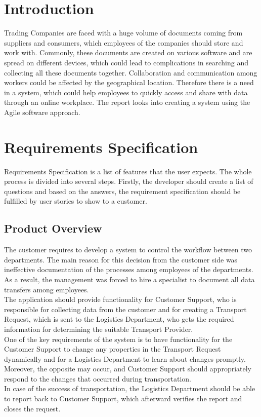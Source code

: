 \documentclass[a4paper]{article}
\begin{document}
\section*{Introduction}
Trading Companies are faced with a huge volume of documents coming from suppliers and consumers, which employees of the companies should store and work with. Commonly, these documents are created on various software and are spread on different devices, which could lead to complications in searching and collecting all these documents together. Collaboration and communication among workers could be affected by the geographical location. Therefore there is a need in a system, which could help employees to quickly access and share with data through an online workplace. 
The report looks into creating a system using the Agile software approach.
\newpage
\section{Requirements Specification} 
    \label{requirementsSpecification}
    Requirements Specification is a list of features that the user expects. The whole process is divided into several steps. Firstly, the developer should create a list of questions and based on the answers, the requirement specification should be fulfilled by user stories to show to a customer.
    
    \subsection{Product Overview}
       The customer requires to develop a system to control the workflow between two departments. The main reason for this decision from the customer side was ineffective documentation of the processes among employees of the departments. As a result, the management was forced to hire a specialist to document all data transfers among employees. \\
       The application should provide functionality for Customer Support, who is responsible for collecting data from the customer and for creating a Transport Request, which is sent to the Logistics Department, who gets the required information for determining the suitable Transport Provider. \\
       One of the key requirements of the system is to have functionality for the Customer Support to change any properties in the Transport Request dynamically and for a Logistics Department to learn about changes promptly. Moreover, the opposite may occur, and Customer Support should appropriately respond to the changes that occurred during transportation. \\
       In case of the success of transportation, the Logistics Department should be able to report back to Customer Support, which afterward verifies the report and closes the request. 
       
\end{document}
